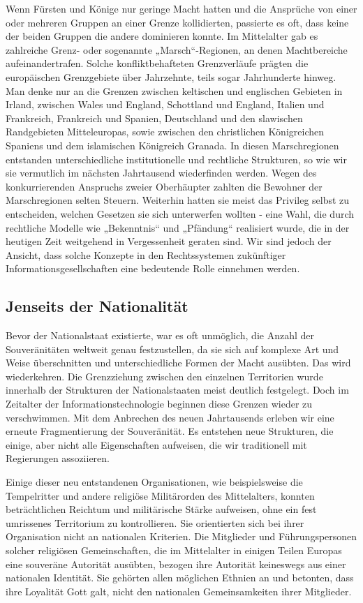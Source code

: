 \documentclass[
  a5paper,
  smalldemyvopaper,10pt,twoside,onecolumn,openright,extrafontsizes,hidelinks]{memoir}
\begin{document}
Wenn Fürsten und Könige nur geringe Macht hatten und die Ansprüche von
einer oder mehreren Gruppen an einer Grenze kollidierten, passierte es
oft, dass keine der beiden Gruppen die andere dominieren konnte. Im
Mittelalter gab es zahlreiche Grenz- oder sogenannte „Marsch``-Regionen,
an denen Machtbereiche aufeinandertrafen. Solche konfliktbehafteten
Grenzverläufe prägten die europäischen Grenzgebiete über Jahrzehnte,
teils sogar Jahrhunderte hinweg. Man denke nur an die Grenzen zwischen
keltischen und englischen Gebieten in Irland, zwischen Wales und
England, Schottland und England, Italien und Frankreich, Frankreich und
Spanien, Deutschland und den slawischen Randgebieten Mitteleuropas,
sowie zwischen den christlichen Königreichen Spaniens und dem
islamischen Königreich Granada. In diesen Marschregionen entstanden
unterschiedliche institutionelle und rechtliche Strukturen, so wie wir
sie vermutlich im nächsten Jahrtausend wiederfinden werden. Wegen des
konkurrierenden Anspruchs zweier Oberhäupter zahlten die Bewohner der
Marschregionen selten Steuern. Weiterhin hatten sie meist das Privileg
selbst zu entscheiden, welchen Gesetzen sie sich unterwerfen wollten -
eine Wahl, die durch rechtliche Modelle wie „Bekenntnis`` und
„Pfändung`` realisiert wurde, die in der heutigen Zeit weitgehend in
Vergessenheit geraten sind. Wir sind jedoch der Ansicht, dass solche
Konzepte in den Rechtssystemen zukünftiger Informationsgesellschaften
eine bedeutende Rolle einnehmen werden.

\subsection{Jenseits der
Nationalität}\label{jenseits-der-nationalituxe4t}

Bevor der Nationalstaat existierte, war es oft unmöglich, die Anzahl der
Souveränitäten weltweit genau festzustellen, da sie sich auf komplexe
Art und Weise überschnitten und unterschiedliche Formen der Macht
ausübten. Das wird wiederkehren. Die Grenzziehung zwischen den einzelnen
Territorien wurde innerhalb der Strukturen der Nationalstaaten meist
deutlich festgelegt. Doch im Zeitalter der Informationstechnologie
beginnen diese Grenzen wieder zu verschwimmen. Mit dem Anbrechen des
neuen Jahrtausends erleben wir eine erneute Fragmentierung der
Souveränität. Es entstehen neue Strukturen, die einige, aber nicht alle
Eigenschaften aufweisen, die wir traditionell mit Regierungen
assoziieren.

Einige dieser neu entstandenen Organisationen, wie beispielsweise die
Tempelritter und andere religiöse Militärorden des Mittelalters, konnten
beträchtlichen Reichtum und militärische Stärke aufweisen, ohne ein fest
umrissenes Territorium zu kontrollieren. Sie orientierten sich bei ihrer
Organisation nicht an nationalen Kriterien. Die Mitglieder und
Führungspersonen solcher religiösen Gemeinschaften, die im Mittelalter
in einigen Teilen Europas eine souveräne Autorität ausübten, bezogen
ihre Autorität keineswegs aus einer nationalen Identität. Sie gehörten
allen möglichen Ethnien an und betonten, dass ihre Loyalität Gott galt,
nicht den nationalen Gemeinsamkeiten ihrer Mitglieder.
\end{document}
